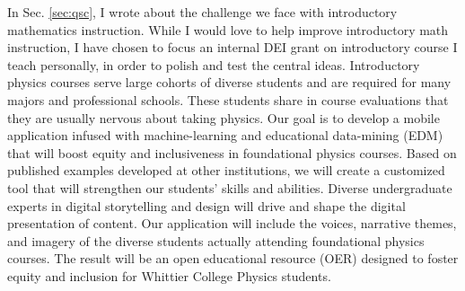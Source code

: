 \documentclass[../../../main.tex]{subfiles}
\begin{document}
\label{sec:dei}

In Sec. \ref{sec:qsc}, I wrote about the challenge we face with introductory mathematics instruction.  While I would love to help improve introductory math instruction, I have chosen to focus an internal DEI grant on introductory course I teach personally, in order to polish and test the central ideas.  Introductory physics courses serve large cohorts of diverse students and are required for many majors and professional schools.  These students share in course evaluations that they are usually nervous about taking physics.  Our goal is to develop a mobile application infused with machine-learning and educational data-mining (EDM) that will boost equity and inclusiveness in foundational physics courses.  Based on published examples developed at other institutions, we will create a
customized tool that will strengthen our students’ skills and abilities. Diverse undergraduate experts in digital storytelling and design will drive and shape the digital presentation of content. Our application will include the voices, narrative themes, and imagery of the diverse students actually attending foundational physics courses. The result will be an open educational resource (OER) designed to foster equity and inclusion for Whittier College Physics students.
\end{document}
